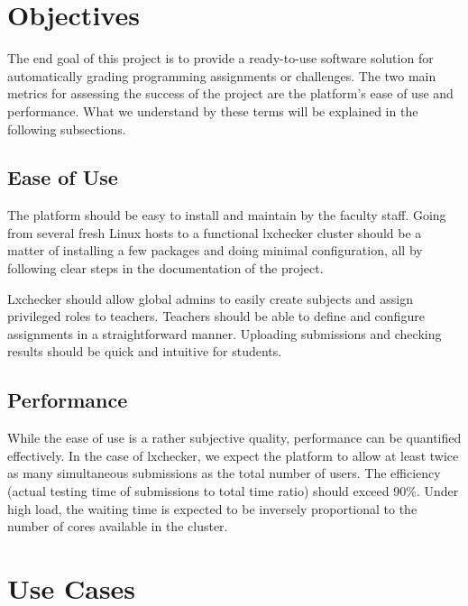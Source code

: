 
\section{Objectives}
\label{sec:objectives}

The end goal of this project is to provide a ready-to-use software solution for automatically grading programming assignments or challenges. The two main metrics for assessing the success of the project are the platform's ease of use and performance. What we understand by these terms will be explained in the following subsections.

\subsection{Ease of Use}
\label{sub-sec:ease-of-use}

The platform should be easy to install and maintain by the faculty staff. Going from several fresh Linux hosts to a functional lxchecker cluster should be a matter of installing a few packages and doing minimal configuration, all by following clear steps in the documentation of the project.

Lxchecker should allow global admins to easily create subjects and assign privileged roles to teachers. Teachers should be able to define and configure assignments in a straightforward manner. Uploading submissions and checking results should be quick and intuitive for students.

\subsection{Performance}
\label{sub-sec:performance}

While the ease of use is a rather subjective quality, performance can be quantified effectively. In the case of lxchecker, we expect the platform to allow at least twice as many simultaneous submissions as the total number of users. The efficiency (actual testing time of submissions to total time ratio) should exceed 90\%. Under high load, the waiting time is expected to be inversely proportional to the number of cores available in the cluster.


\section{Use Cases}
\label{sec:use-cases}

